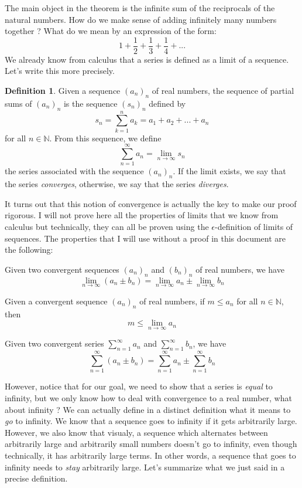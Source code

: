 \documentclass[12pt]{article}
\newcommand{\N}{\mathbb{N}}
\theoremstyle{definition}
\newtheorem*{definition}{Definition}
\newcounter{prop}[section]
\newenvironment{prop}{%
  \refstepcounter{prop}%
  \renewcommand*{\theenumi}{(\roman{enumi})}%
  \renewcommand*{\labelenumi}{(\roman{enumi})}%
  \enumerate
}{%
  \endenumerate
}
\begin{document}
The main object in the theorem is the infinite sum of the reciprocals of the natural numbers. How do we make sense of adding infinitely many numbers together ? What do we mean by an expression of the form:
$$1 + \frac{1}{2} + \frac{1}{3} + \frac{1}{4} + ...$$
We already know from calculus that a series is defined as a limit of a sequence. Let's write this more precisely.

\begin{definition}
    Given a sequence $(a_n)_n$ of real numbers, the sequence of partial sums of $(a_n)_n$ is the sequence $(s_n)_n$ defined by
    $$s_n = \sum_{k=1}^{n}a_k = a_1 + a_2 + ... + a_n$$
    for all $n \in \N$. From this sequence, we define
    $$\sum_{n=1}^{\infty}a_n = \lim_{n \rightarrow \infty}s_n$$
    the series associated with the sequence $(a_n)_n$. If the limit exists, we say that the series \textit{converges}, otherwise, we say that the series \textit{diverges}.\\
\end{definition}

It turns out that this notion of convergence is actually the key to make our proof rigorous. I will not prove here all the properties of limits that we know from calculus but technically, they can all be proven using the $\epsilon$-definition of limits of sequences. The properties that I will use without a proof in this document are the following: 

\begin{prop}
    \item\label{prop1} Given two convergent sequences $(a_n)_n$ and $(b_n)_n$ of real numbers, we have
    $$\lim_{n \rightarrow \infty}(a_n \pm b_n) = \lim_{n \rightarrow \infty}a_n \pm \lim_{n \rightarrow \infty}b_n$$

    \item\label{prop2} Given a convergent sequence $(a_n)_n$ of real numbers, if $m \leq a_n$ for all $n \in \N$, then
    $$m \leq \lim_{n \rightarrow \infty}a_n$$

    \item\label{prop3} Given two convergent series $\sum_{n=1}^{\infty}a_n$ and $\sum_{n=1}^{\infty}b_n$, we have
    $$\sum_{n=1}^{\infty}(a_n \pm b_n) = \sum_{n=1}^{\infty}a_n \pm \sum_{n=1}^{\infty}b_n$$
\end{prop}

However, notice that for our goal, we need to show that a series is \textit{equal} to infinity, but we only know how to deal with convergence to a real number, what about infinity ? We can actually define in a distinct definition what it means to \textit{go} to infinity. We know that a sequence goes to infinity if it gets arbitrarily large. However, we also know that visualy, a sequence which alternates between arbitrarily large and arbitrarily small numbers doesn't go to infinity, even though technically, it has arbitrarily large terms. In other words, a sequence that goes to infinity needs to \textit{stay} arbitrarily large. Let's summarize what we just said in a precise definition.
\end{document}
